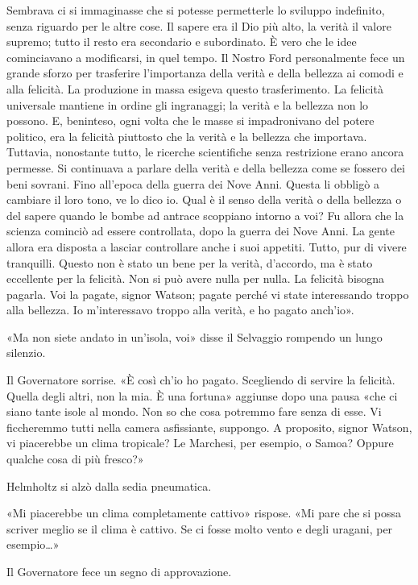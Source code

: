 \documentclass[
a5paper, %
10pt, %
twoside, 
onecolumn, %
openany, %
]{memoir}
\begin{document}
Sembrava ci si immaginasse che si potesse permetterle lo sviluppo indefinito, senza riguardo per le altre cose. Il sapere era il Dio più alto, la verità il valore supremo; tutto il resto era secondario e subordinato. È vero che le idee cominciavano a modificarsi, in quel tempo. Il Nostro Ford personalmente fece un grande sforzo per trasferire l’importanza della verità e della bellezza ai comodi e alla felicità. La produzione in massa esigeva questo trasferimento. La felicità universale mantiene in ordine gli ingranaggi; la verità e la bellezza non lo possono. E, beninteso, ogni volta che le masse si impadronivano del potere politico, era la felicità piuttosto che la verità e la bellezza che importava. Tuttavia, nonostante tutto, le ricerche scientifiche senza restrizione erano ancora permesse. Si continuava a parlare della verità e della bellezza come se fossero dei beni sovrani. Fino all’epoca della guerra dei Nove Anni. Questa li obbligò a cambiare il loro tono, ve lo dico io. Qual è il senso della verità o della bellezza o del sapere quando le bombe ad antrace scoppiano intorno a voi? Fu allora che la scienza cominciò ad essere controllata, dopo la guerra dei Nove Anni. La gente allora era disposta a lasciar controllare anche i suoi appetiti. Tutto, pur di vivere tranquilli. Questo non è stato un bene per la verità, d’accordo, ma è stato eccellente per la felicità. Non si può avere nulla per nulla. La felicità bisogna pagarla. Voi la pagate, signor Watson; pagate perché vi state interessando troppo alla bellezza. Io m’interessavo troppo alla verità, e ho pagato anch’io».

«Ma non siete andato in un’isola, voi» disse il Selvaggio rompendo un lungo silenzio.

Il Governatore sorrise. «È così ch’io ho pagato. Scegliendo di servire la felicità. Quella degli altri, non la mia. È una fortuna» aggiunse dopo una pausa «che ci siano tante isole al mondo. Non so che cosa potremmo fare senza di esse. Vi ficcheremmo tutti nella camera asfissiante, suppongo. A proposito, signor Watson, vi piacerebbe un clima tropicale? Le Marchesi, per esempio, o Samoa? Oppure qualche cosa di più fresco?»

Helmholtz si alzò dalla sedia pneumatica.

«Mi piacerebbe un clima completamente cattivo» rispose. «Mi pare che si possa scriver meglio se il clima è cattivo. Se ci fosse molto vento e degli uragani, per esempio…»

Il Governatore fece un segno di approvazione.
\end{document}
